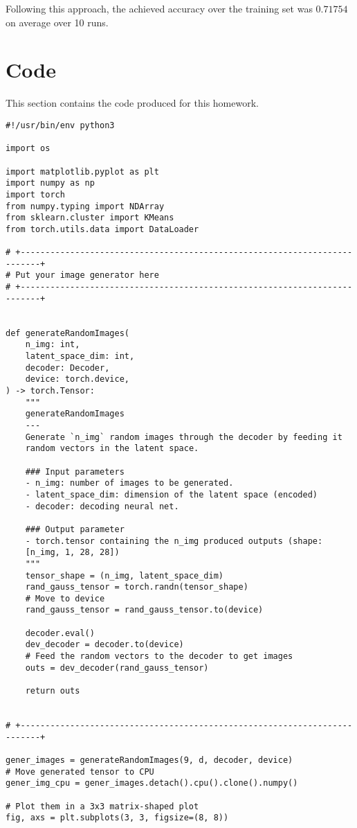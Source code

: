 \documentclass[12pt]{article}
\begin{document}
Following this approach, the achieved accuracy over the training set was $0.71754$ on average over 10 runs.

\section{Code}

This section contains the code produced for this homework.

\begin{verbatim}
#!/usr/bin/env python3

import os

import matplotlib.pyplot as plt
import numpy as np
import torch
from numpy.typing import NDArray
from sklearn.cluster import KMeans
from torch.utils.data import DataLoader

# +--------------------------------------------------------------------------+
# Put your image generator here
# +--------------------------------------------------------------------------+


def generateRandomImages(
    n_img: int,
    latent_space_dim: int,
    decoder: Decoder,
    device: torch.device,
) -> torch.Tensor:
    """
    generateRandomImages
    ---
    Generate `n_img` random images through the decoder by feeding it
    random vectors in the latent space.

    ### Input parameters
    - n_img: number of images to be generated.
    - latent_space_dim: dimension of the latent space (encoded)
    - decoder: decoding neural net.

    ### Output parameter
    - torch.tensor containing the n_img produced outputs (shape:
    [n_img, 1, 28, 28])
    """
    tensor_shape = (n_img, latent_space_dim)
    rand_gauss_tensor = torch.randn(tensor_shape)
    # Move to device
    rand_gauss_tensor = rand_gauss_tensor.to(device)

    decoder.eval()
    dev_decoder = decoder.to(device)
    # Feed the random vectors to the decoder to get images
    outs = dev_decoder(rand_gauss_tensor)

    return outs


# +--------------------------------------------------------------------------+

gener_images = generateRandomImages(9, d, decoder, device)
# Move generated tensor to CPU
gener_img_cpu = gener_images.detach().cpu().clone().numpy()

# Plot them in a 3x3 matrix-shaped plot
fig, axs = plt.subplots(3, 3, figsize=(8, 8))


\end{verbatim}
\end{document}
